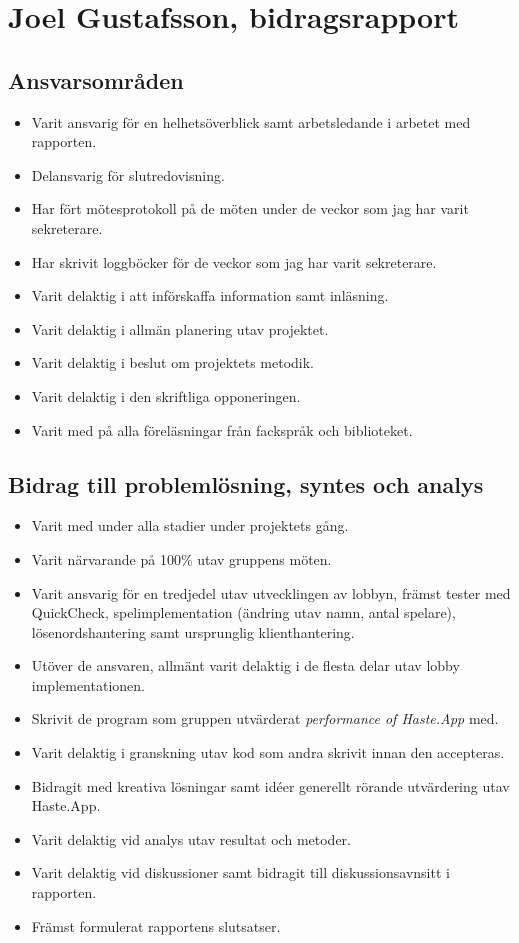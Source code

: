 
\section{Joel Gustafsson, bidragsrapport}
\subsection{Ansvarsområden}
\begin{itemize}
  \item Varit ansvarig för en helhetsöverblick samt arbetsledande i arbetet med rapporten.
  \item Delansvarig för slutredovisning.
  \item Har fört mötesprotokoll på de möten under de veckor som jag har varit sekreterare.
  \item Har skrivit loggböcker för de veckor som jag har varit sekreterare.
  \item Varit delaktig i att införskaffa information samt inläsning.
  \item Varit delaktig i allmän planering utav projektet.
  \item Varit delaktig i beslut om projektets metodik.
  \item Varit delaktig i den skriftliga opponeringen.
  \item Varit med på alla föreläsningar från fackspråk och biblioteket.
\end{itemize}

\subsection{Bidrag till problemlösning, syntes och analys}
\begin{itemize}
  \item Varit med under alla stadier under projektets gång.
  \item Varit närvarande på 100\% utav gruppens möten.

  \item Varit ansvarig för en tredjedel utav utvecklingen av lobbyn, främst tester med QuickCheck, spelimplementation (ändring utav namn, antal spelare), lösenordshantering samt ursprunglig klienthantering.
  \item Utöver de ansvaren, allmänt varit delaktig i de flesta delar utav lobby implementationen.

  \item Skrivit de program som gruppen utvärderat \textit{performance of Haste.App} med.
  \item Varit delaktig i granskning utav kod som andra skrivit innan den accepteras.

  \item Bidragit med kreativa lösningar samt idéer generellt rörande utvärdering utav Haste.App.
  \item Varit delaktig vid analys utav resultat och metoder.
  \item Varit delaktig vid diskussioner samt bidragit till diskussionsavnsitt i rapporten.
  \item Främst formulerat rapportens slutsatser.
\end{itemize}


